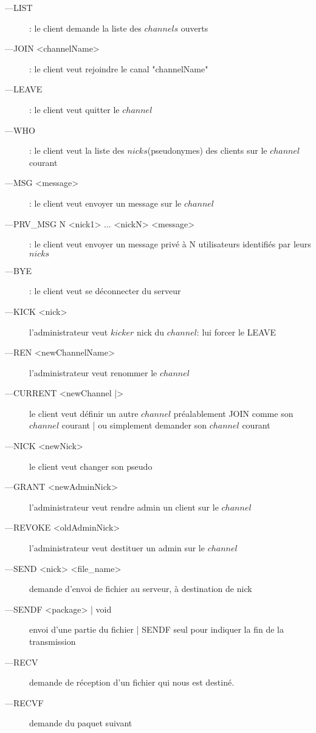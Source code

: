 \documentclass[12pt]{article}
\begin{document}
\begin{description}
    \item[---LIST]: le client demande la liste des $channels$ ouverts
    \item[---JOIN <channelName>]: le client veut rejoindre le canal "channelName" 
    \item[---LEAVE]: le client veut quitter le $channel$
    \item[---WHO] : le client veut la liste des $nicks$(pseudonymes) des clients
    sur le $channel$ courant
    \item[---MSG <message>]: le client veut envoyer un message sur le $channel$
    \item[---PRV\_MSG N <nick1> ... <nickN> <message>]: le client veut
         envoyer un message privé à N utilisateurs identifiés par leurs $nicks$
    \item[---BYE]: le client veut se déconnecter du serveur
    \item[---KICK <nick>]  l'administrateur veut $kicker$ nick
    du $channel$: lui forcer le LEAVE
    \item[---REN <newChannelName>]  l'administrateur veut renommer le $channel$
    \item[---CURRENT <newChannel |>]  le client veut définir un autre
    $channel$ préalablement JOIN comme son $channel$ courant | ou simplement
    demander son $channel$ courant
    \item[---NICK <newNick>]  le client veut changer son pseudo
    \item[---GRANT <newAdminNick>]  l'administrateur veut rendre admin
                                                un client sur le $channel$ 
    \item[---REVOKE <oldAdminNick>]  l'administrateur veut destituer 
                                            un admin sur le $channel$
    \item[---SEND <nick> <file\_name>]  demande d'envoi de fichier au serveur, à destination de nick
    \item[---SENDF <package> | void ]  envoi d'une partie du fichier | SENDF seul pour indiquer la fin de la transmission
    \item[---RECV]  demande de réception d'un fichier qui nous est destiné.
    \item[---RECVF]  demande du paquet suivant
    \\
\end{description}
\end{document}
